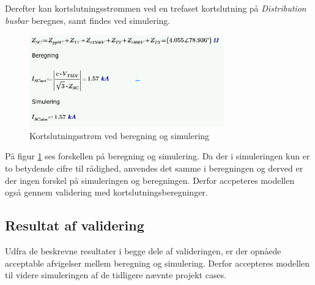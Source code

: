 Derefter kan kortslutningsstrømmen ved en trefaset kortslutning på \textit{Distribution busbar} beregnes, samt findes ved simulering.

\begin{figure}[H] %
	\centering
	\includegraphics[width=0.75\textwidth]{figurer/Kortslutningsstroem_validering}
	\caption{Kortslutningsstrøm ved beregning og simulering}
	\label{fig:SCvalidering}
\end{figure}

På figur \ref{fig:SCvalidering} ses forskellen på beregning og simulering. Da der i simuleringen kun er to betydende cifre til rådighed, anvendes det samme i beregningen og derved er der ingen forskel på simuleringen og beregningen. Derfor accpeteres modellen også gennem validering med kortslutningsberegninger.

\subsection{Resultat af validering}

Udfra de beskrevne resultater i begge dele af valideringen, er der opnåede acceptable afvigelser mellem beregning og simulering. Derfor accepteres modellen til videre simuleringen af de tidligere nævnte projekt cases.